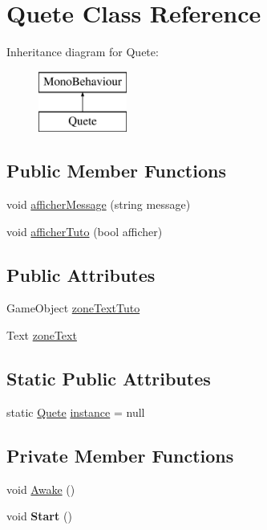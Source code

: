 \hypertarget{class_quete}{}\section{Quete Class Reference}
\label{class_quete}
Inheritance diagram for Quete\+:\begin{figure}[H]
\begin{center}
\leavevmode
\includegraphics[height=2.000000cm]{class_quete}
\end{center}
\end{figure}
\subsection*{Public Member Functions}
\begin{DoxyCompactItemize}
\item 
void \mbox{\hyperlink{class_quete_aaa6d56872c638d4d638f177aa007f806}{afficher\+Message}} (string message)
\item 
void \mbox{\hyperlink{class_quete_a41ce4f53ca28d9ae01c582ea97086dc7}{afficher\+Tuto}} (bool afficher)
\end{DoxyCompactItemize}
\subsection*{Public Attributes}
\begin{DoxyCompactItemize}
\item 
Game\+Object \mbox{\hyperlink{class_quete_adad53e5e4589ff56802d22053d12f0e6}{zone\+Text\+Tuto}}
\item 
Text \mbox{\hyperlink{class_quete_aec767eb7fcca6ffd262bf7bdac0e0c82}{zone\+Text}}
\end{DoxyCompactItemize}
\subsection*{Static Public Attributes}
\begin{DoxyCompactItemize}
\item 
static \mbox{\hyperlink{class_quete}{Quete}} \mbox{\hyperlink{class_quete_addf0701af1e0e04e11887c2626feb0ce}{instance}} = null
\end{DoxyCompactItemize}
\subsection*{Private Member Functions}
\begin{DoxyCompactItemize}
\item 
void \mbox{\hyperlink{class_quete_ab2c08c75954a9f4627cb7d298e55a92f}{Awake}} ()
\item 
\mbox{\label{class_quete_aad67f2de4a68684143f269055684ae78}} 
void {\bfseries Start} ()
\end{DoxyCompactItemize}


